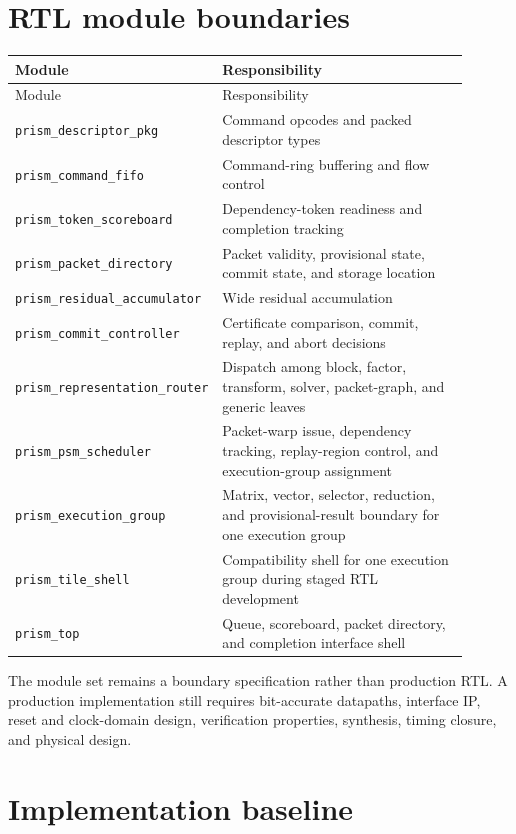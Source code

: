 \documentclass[11pt,oneside,openany]{book}
\theoremstyle{remark}
\begin{document}
\chapter{RTL module boundaries}
\begin{longtable}{L{0.34\linewidth}L{0.56\linewidth}}
\toprule
Module & Responsibility \\
\midrule
\endfirsthead
\toprule
Module & Responsibility \\
\midrule
\endhead
\texttt{prism\_descriptor\_pkg} & Command opcodes and packed descriptor types \\
\texttt{prism\_command\_fifo} & Command-ring buffering and flow control \\
\texttt{prism\_token\_scoreboard} & Dependency-token readiness and completion tracking \\
\texttt{prism\_packet\_directory} & Packet validity, provisional state, commit state, and storage location \\
\texttt{prism\_residual\_accumulator} & Wide residual accumulation \\
\texttt{prism\_commit\_controller} & Certificate comparison, commit, replay, and abort decisions \\
\texttt{prism\_representation\_router} & Dispatch among block, factor, transform, solver, packet-graph, and generic leaves \\
\texttt{prism\_psm\_scheduler} & Packet-warp issue, dependency tracking, replay-region control, and execution-group assignment \\
\texttt{prism\_execution\_group} & Matrix, vector, selector, reduction, and provisional-result boundary for one execution group \\
\texttt{prism\_tile\_shell} & Compatibility shell for one execution group during staged RTL development \\
\texttt{prism\_top} & Queue, scoreboard, packet directory, and completion interface shell \\
\bottomrule
\end{longtable}

The module set remains a boundary specification rather than production RTL. A production implementation still requires bit-accurate datapaths, interface IP, reset and clock-domain design, verification properties, synthesis, timing closure, and physical design.

\chapter{Implementation baseline}
\end{document}
